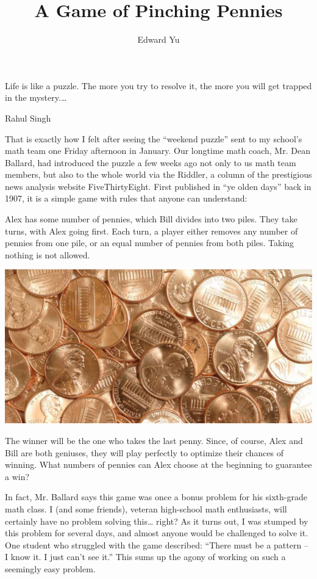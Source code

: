\documentclass{article}
\title{A Game of Pinching Pennies}
\author{Edward Yu}
\begin{document}
\maketitle
\epigraph{Life is like a puzzle. The more you try to resolve it, the more you will get trapped in the mystery.\dots}{Rahul Singh}

That is exactly how I felt after seeing the “weekend puzzle” sent to my school’s math team one Friday afternoon in January. Our longtime math coach, Mr. Dean Ballard, had introduced the puzzle a few weeks ago not only to us math team members, but also to the whole world via the Riddler, a column of the prestigious news analysis website FiveThirtyEight. First published in ``ye olden days'' back in 1907, it is a simple game with rules that anyone can understand:

Alex has some number of pennies, which Bill divides into two piles. They take turns, with Alex going first. Each turn, a player either removes any number of pennies from one pile, or an equal number of pennies from both piles. Taking nothing is not allowed.

\begin{center}
     \includegraphics[scale=0.8]{images/play_game.png}
\end{center}

The winner will be the one who takes the last penny. Since, of course, Alex and Bill are both geniuses, they will play perfectly to optimize their chances of winning. What numbers of pennies can Alex choose at the beginning to guarantee a win?


In fact, Mr. Ballard says this game was once a bonus problem for his sixth-grade math class. I (and some friends), veteran high-school math enthusiasts, will certainly have no problem solving this… right? As it turns out, I was stumped by this problem for several days, and almost anyone would be challenged to solve it. One student who struggled with the game described: “There must be a pattern – I know it. I just can’t see it.” This sums up the agony of working on such a seemingly easy problem.
\end{document}
